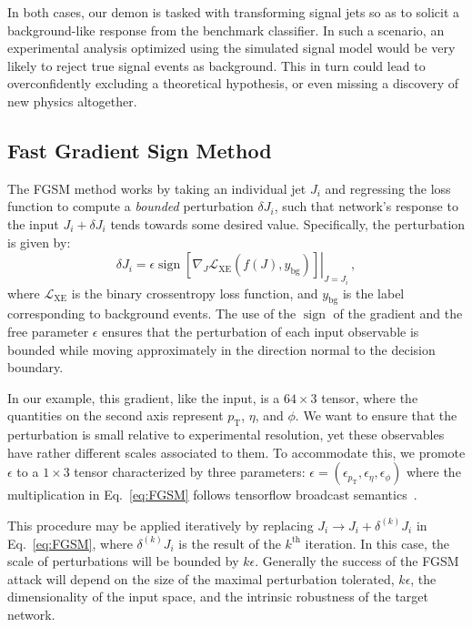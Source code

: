 \documentclass[reprint,nofootinbib,...]{revtex4-1}
\DeclareMathOperator{\sign}{sign}
\newcommand{\nconst}{64}       %
\newcommand{\pt}{p_\mathrm{T}} %
\begin{document}
In both cases, our demon is tasked with transforming signal jets so as to solicit a background-like response from the benchmark classifier.
In such a scenario, an experimental analysis optimized using the simulated signal model would be very likely to reject true signal events as background.
This in turn could lead to overconfidently excluding a theoretical hypothesis, or even missing a discovery of new physics altogether.

\subsection{Fast Gradient Sign Method}
\label{subsec:fgsm}
The FGSM method works by taking an individual jet $J_i$ and regressing the loss function to compute a \textit{bounded} perturbation $\delta J_i$, such that network's response to the input $J_i + \delta J_i$ tends towards some desired value.
Specifically, the perturbation is given by:
\begin{equation}
\label{eq:FGSM}
\delta J_i = \epsilon\left.\sign\left[\nabla_{J} \mathcal{L}_\text{XE}\left(f(J), y_\mathrm{bg}\right)\right]\right\rvert_{J=J_i} \,,
\end{equation}
where $\mathcal{L}_\text{XE}$ is the binary crossentropy loss function, and $y_\mathrm{bg}$ is the label corresponding to background events.
The use of the $\sign$ of the gradient and the free parameter $\epsilon$ ensures that the perturbation of each input observable is bounded while moving approximately in the direction normal to the decision boundary.

In our example, this gradient, like the input, is a $\nconst\times3$ tensor, where the quantities on the second axis represent $\pt$, $\eta$, and $\phi$.
We want to ensure that the perturbation is small relative to experimental resolution, yet these observables have rather different scales associated to them.
To accommodate this, we promote $\epsilon$ to a $1\times3$ tensor characterized by three parameters: $\epsilon = (\epsilon_{\pt}, \epsilon_\eta, \epsilon_\phi)$ where the multiplication in Eq.~\ref{eq:FGSM} follows tensorflow broadcast semantics~\cite{tensorflow}.

This procedure may be applied iteratively by replacing $J_i \rightarrow J_i + \delta^{(k)} J_i$ in Eq.~\ref{eq:FGSM}, where $\delta^{(k)}J_i$ is the result of the $k^\mathrm{th}$ iteration.
In this case, the scale of perturbations will be bounded by $k\epsilon$.
Generally the success of the FGSM attack will depend on the size of the maximal perturbation tolerated, $k\epsilon$, the dimensionality of the input space, and the intrinsic robustness of the target network.
\end{document}
